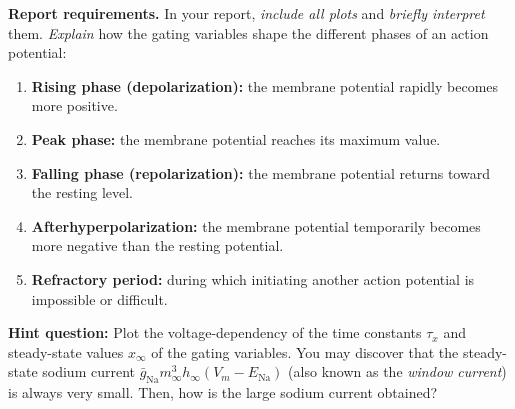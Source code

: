 \documentclass{article}
\begin{document}
\noindent\textbf{Report requirements.}
In your report, \textit{include all plots} and \textit{briefly interpret} them.
\emph{Explain} how the gating variables shape the different phases of an action potential:

\begin{enumerate}
    \item \textbf{Rising phase (depolarization):} the membrane potential rapidly becomes more positive.
    \item \textbf{Peak phase:} the membrane potential reaches its maximum value.
    \item \textbf{Falling phase (repolarization):} the membrane potential returns toward the resting level.
    \item \textbf{Afterhyperpolarization:} the membrane potential temporarily becomes more negative than the resting potential.
    \item \textbf{Refractory period:} during which initiating another action potential is impossible or difficult.
\end{enumerate}

\textbf{Hint question:} Plot the voltage-dependency of the time constants $\tau_x$ and steady-state values $x_{\infty}$ of the gating variables.
You may discover that the steady-state sodium current $\bar{g}_{\scriptscriptstyle\text{Na}}m_{\infty}^3h_{\infty}(V_m-E_{\scriptscriptstyle\text{Na}})$ (also known as the \textit{window current}) is always very small.
Then, how is the large sodium current obtained?
\end{document}
